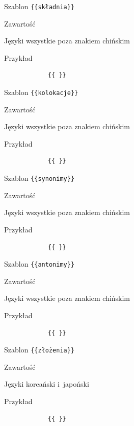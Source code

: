\documentclass{pracamgr}
\newcommand{\spacer}{
	\begin{center}
		\textasteriskcentered
	\end{center}
}
\newenvironment{description-sub}[0]{
	\begin{basedescript}{\desclabelstyle{\pushlabel}\desclabelwidth{6em}}\setlength{\itemsep}{-2mm}
}{
	\end{basedescript}
}
\begin{document}
\spacer
\begin{description-sub}
	\item[Szablon] \verb|{{składnia}}|
	\item[Zawartość]
	\item[Języki] wszystkie poza znakiem chińskim
	\item[Przykład]
		\begin{verbatim}
			{{ }}
		\end{verbatim}
\end{description-sub}
\spacer
\begin{description-sub}
	\item[Szablon] \verb|{{kolokacje}}|
	\item[Zawartość]
	\item[Języki] wszystkie poza znakiem chińskim
	\item[Przykład]
		\begin{verbatim}
			{{ }}
		\end{verbatim}
\end{description-sub}
\spacer
\begin{description-sub}
	\item[Szablon] \verb|{{synonimy}}|
	\item[Zawartość]
	\item[Języki] wszystkie poza znakiem chińskim
	\item[Przykład]
		\begin{verbatim}
			{{ }}
		\end{verbatim}
\end{description-sub}
\spacer
\begin{description-sub}
	\item[Szablon] \verb|{{antonimy}}|
	\item[Zawartość]
	\item[Języki] wszystkie poza znakiem chińskim
	\item[Przykład]
		\begin{verbatim}
			{{ }}
		\end{verbatim}
\end{description-sub}
\spacer
\begin{description-sub}
	\item[Szablon] \verb|{{złożenia}}|
	\item[Zawartość]
	\item[Języki] koreański i~japoński
	\item[Przykład]
		\begin{verbatim}
			{{ }}
		\end{verbatim}
\end{description-sub}
\end{document}
